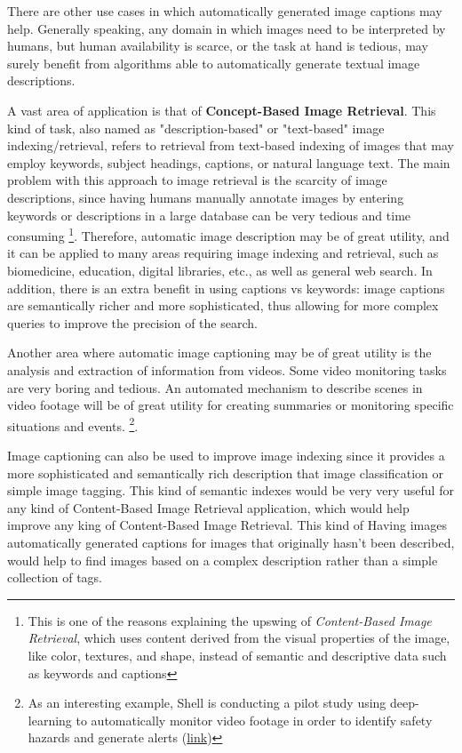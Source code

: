 There are other use cases in which automatically generated image captions may help. Generally speaking, any domain in which images need to be interpreted by humans, but human availability is scarce, or the task at hand is tedious, may surely benefit from algorithms able to automatically generate textual image descriptions.

A vast area of application is that of \textbf{Concept-Based Image Retrieval}. This kind of task, also named as "description-based" or "text-based" image indexing/retrieval, refers to retrieval from text-based indexing of images that may employ keywords, subject headings, captions, or natural language text. The main problem with this approach to image retrieval is the scarcity of image descriptions, since having humans manually annotate images by entering keywords or descriptions in a large database can be very tedious and time consuming \footnote{This is one of the reasons explaining the upswing of \textit{Content-Based Image Retrieval}, which uses content derived from the visual properties of the image, like color, textures, and shape, instead of semantic and descriptive data such as keywords and captions}.  Therefore, automatic image description may be of great utility, and it can be applied to many areas requiring image indexing and retrieval, such as biomedicine, education, digital libraries, etc., as well as general web search. In addition, there is an extra benefit in using captions vs keywords: image captions are semantically richer and more sophisticated, thus allowing for more complex queries to improve the precision of the search.

Another area where automatic image captioning may be of great utility is the analysis and extraction of information from videos. Some video monitoring tasks are very boring and tedious. An automated mechanism to describe scenes in video footage will be of great utility for creating summaries or monitoring specific situations and events. \footnote{As an interesting example, Shell is conducting a pilot study using deep-learning to automatically monitor video footage in order to identify safety hazards and generate alerts (\href{https://customers.microsoft.com/en-us/story/shell-mining-oil-gas-azure-databricks}{link})}.

Image captioning can also be used to improve image indexing since it provides a more sophisticated and semantically rich description that image classification or simple image tagging. This kind of semantic indexes would be very very useful for any kind of Content-Based Image Retrieval application, which would help improve any king of Content-Based Image Retrieval. This kind of Having images automatically generated captions for images that originally hasn't been described, would help to find images based on a complex description rather than a simple collection of tags. 

